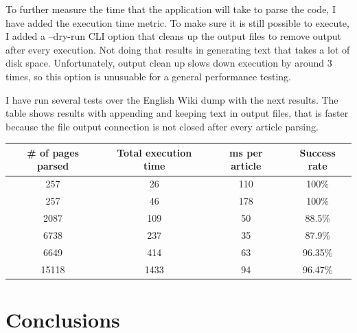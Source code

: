 \documentclass[thesis=M,english,hidelinks]{FITthesis}[2019/12/23]
\begin{document}
To further measure the time that the application will take to parse the code, I have added the execution time metric. To make sure it is still possible to execute, I added a --dry-run CLI option that cleans up the output files to remove output after every execution. Not doing that results in generating text that takes a lot of disk space. Unfortunately, output clean up slows down execution by around 3 times, so this option is unusuable for a general performance testing.

I have run several tests over the English Wiki dump with the next results. The table shows results with appending and keeping text in output files, that is faster because the file output connection is not closed after every article parsing.

\begin{tabular}{|c|c|c|c|}
	\hline
	\# of pages parsed & Total execution time &  ms per article &  Success rate\\
	\hline
	257 & 26 & 110 & 100\% \\
	\hline
	257 & 46 & 178 & 100\% \\
	\hline
	2087 & 109  & 50 & 88.5\% \\
	\hline
	6738 & 237  & 35 & 87.9\% \\
	\hline
	6649 & 414  & 63 & 96.35\% \\
	\hline
	15118 &  1433 & 94 & 96.47\% \\
	\hline
\end{tabular}

\chapter{Conclusions}
\end{document}

